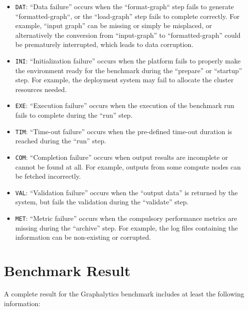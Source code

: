 \begin{itemize}
    \item \texttt{DAT}: ``Data failure'' occurs when the ``format-graph`` step fails to generate ``formatted-graph``, or the ``load-graph'' step fails to complete correctly. For example, ``input graph'' can be missing or simply be misplaced, or alternatively the conversion from ``input-graph'' to ``formatted-graph'' could be prematurely interrupted, which leads to data corruption.
    
    \item \texttt{INI}: ``Initialization failure'' occurs when the platform fails to properly make the environment ready for the benchmark during the ``prepare'' or ``startup'' step. For example, the deployment system may fail to allocate the cluster resources needed.
    
    \item \texttt{EXE}: ``Execution failure'' occurs when the execution of the benchmark run fails to complete during the ``run'' step.
    
    \item \texttt{TIM}: ``Time-out failure'' occurs when the pre-defined time-out duration is reached during the ``run'' step.

    \item \texttt{COM}: ``Completion failure'' occurs when output results are incomplete or cannot be found at all. For example, outputs from some compute nodes can be fetched incorrectly.
    
    \item \texttt{VAL}: ``Validation failure'' occurs when the ``output data'' is returned by the system, but fails the validation during the ``validate'' step.
    
    \item \texttt{MET}: ``Metric failure'' occurs when the compulsory performance metrics are missing during the ``archive'' step. For example, the log files containing the information can be non-existing or corrupted.
\end{itemize}










\section{Benchmark Result}

 A complete result for the Graphalytics benchmark includes at least the following information: 

